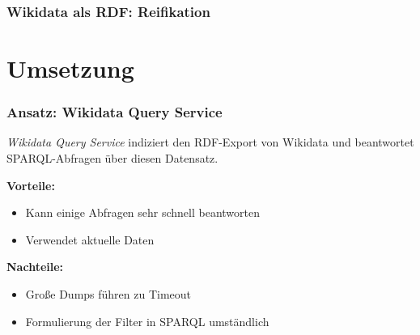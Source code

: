 \documentclass[aspectratio=1609,xcolor=usenames,dvipsnames,svgnames]{beamer}
\begin{document}
\begin{frame}[t, fragile]\frametitle{Wikidata als RDF: Reifikation}
  \vspace{0.25cm}
  
\end{frame}


\section{Umsetzung}

\begin{frame}\frametitle{Ansatz: Wikidata Query Service}
  \emph{Wikidata Query Service} indiziert den RDF-Export von Wikidata und
  beantwortet SPARQL-Abfragen über diesen Datensatz.

  \textbf{Vorteile:}
  \begin{itemize}
    \item Kann einige Abfragen sehr schnell beantworten
    \item Verwendet aktuelle Daten
  \end{itemize}
  \textbf{Nachteile:}
  \begin{itemize}
    \item Große Dumps führen zu Timeout
    \item Formulierung der Filter in SPARQL umständlich
  \end{itemize}

\end{frame}
\end{document}
